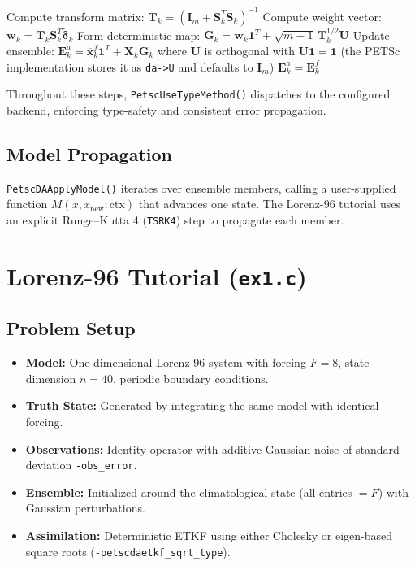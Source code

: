 \documentclass[11pt]{article}
\begin{document}
\begin{algorithm}
\begin{algorithmic}[1]
        \State Compute transform matrix: $\mathbf{T}_k = (\mathbf{I}_m + \mathbf{S}_k^T\mathbf{S}_k)^{-1}$ 
        \State Compute weight vector: $\mathbf{w}_k = \mathbf{T}_k \mathbf{S}_k^T \tilde{\boldsymbol{\delta}}_k$ 
        \State Form deterministic map: $\mathbf{G}_k = \mathbf{w}_k\mathbf{1}^T + \sqrt{m-1}\,\mathbf{T}_k^{1/2}\mathbf{U}$ 
        \State Update ensemble: $\mathbf{E}_k^a = \overline{\mathbf{x}}_k^f\mathbf{1}^T + \mathbf{X}_k \mathbf{G}_k$ 
        \State where $\mathbf{U}$ is orthogonal with $\mathbf{U}\mathbf{1} = \mathbf{1}$ (the PETSc implementation stores it as \texttt{da->U} and defaults to $\mathbf{I}_m$)
    \Else
        \State $\mathbf{E}_k^a = \mathbf{E}_k^f$ 
    \EndIf
\EndFor
\end{algorithmic}
\end{algorithm}

Throughout these steps, \texttt{PetscUseTypeMethod()} dispatches to the configured backend, enforcing type-safety and consistent error propagation.

\subsection{Model Propagation}

\texttt{PetscDAApplyModel()} iterates over ensemble members, calling a user-supplied function $M(x, x_{\text{new}}; \text{ctx})$ that advances one state. The Lorenz-96 tutorial uses an explicit Runge--Kutta 4 (\texttt{TSRK4}) step to propagate each member.

\section{Lorenz-96 Tutorial (\texttt{ex1.c})}

\subsection{Problem Setup}

\begin{itemize}[nosep]
  \item \textbf{Model:} One-dimensional Lorenz-96 system with forcing $F=8$, state dimension $n=40$, periodic boundary conditions.
  \item \textbf{Truth State:} Generated by integrating the same model with identical forcing.
  \item \textbf{Observations:} Identity operator with additive Gaussian noise of standard deviation \texttt{-obs\_error}.
  \item \textbf{Ensemble:} Initialized around the climatological state (all entries $=F$) with Gaussian perturbations.
  \item \textbf{Assimilation:} Deterministic ETKF using either Cholesky or eigen-based square roots (\texttt{-petscdaetkf\_sqrt\_type}).
\end{itemize}
\end{document}
